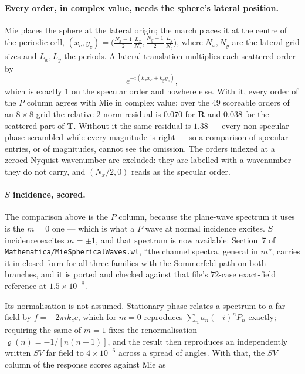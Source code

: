 \documentclass[11pt,a4paper]{article}
\newcommand{\bT}{\mathbf{T}}
\newcommand{\bR}{\mathbf{R}}
\begin{document}
\paragraph{Every order, in complex value, needs the sphere's lateral
position.}  Mie places the sphere at the lateral origin; the march places it at
the centre of the periodic cell, $(x_c,y_c)=\bigl(\tfrac{N_x-1}{2}\,\tfrac{L_x}{N_x},
\tfrac{N_y-1}{2}\,\tfrac{L_y}{N_y}\bigr)$, where $N_x,N_y$ are the lateral
grid sizes and $L_x,L_y$ the periods.  A lateral translation multiplies each
scattered order by
\begin{equation}\label{eq:centrephase}
  e^{-i(k_x x_c + k_y y_c)},
\end{equation}
which is exactly $1$ on the specular order and nowhere else.  With it, every
order of the $P$ column agrees with Mie in complex value: over the $49$
scoreable orders of an $8\times8$ grid the relative $2$-norm residual is
$0.070$ for $\bR$ and $0.038$ for the scattered part of $\bT$.  Without it the same residual is $1.38$ --- every non-specular phase
scrambled while every magnitude is right --- so a comparison of specular
entries, or of magnitudes, cannot see the omission.  The
orders indexed at a zeroed Nyquist wavenumber are excluded: they are labelled
with a wavenumber they do not carry, and $(N_x/2,0)$ reads as the specular
order.

\paragraph{$S$ incidence, scored.}  The comparison above is the $P$ column,
because the plane-wave spectrum it uses is the $m=0$ one --- which is what a $P$
wave at normal incidence excites.  $S$ incidence excites $m=\pm1$, and that
spectrum is now available: Section~7 of
\texttt{Mathematica/MieSphericalWaves.wl}, ``the channel spectra, general in
$m$'', carries it in closed form for all three families with the Sommerfeld path
on both branches, and it is ported and checked against that file's $72$-case
exact-field reference at $1.5\times10^{-8}$.

Its normalisation is not assumed.  Stationary phase relates a spectrum to a far
field by $f=-2\pi i k_z c$, which for $m=0$ reproduces
$\sum_n a_n(-i)^n P_n$ exactly; requiring the same of $m=1$ fixes the
renormalisation $\varrho(n)=-1/[n(n+1)]$, and the result then reproduces an
independently written $SV$ far field to $4\times10^{-6}$ across a spread of
angles.  With that, the $SV$ column of the response scores against Mie as
\end{document}
